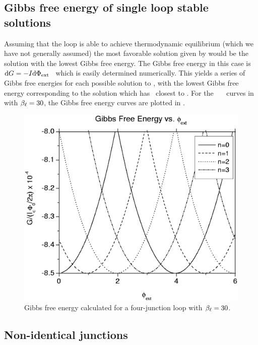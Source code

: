 \subsection{Gibbs free energy of single loop stable solutions}
\label{sec:gibbs_free_energy}

Assuming that the loop is able to achieve thermodynamic equilibrium
(which we have not generally assumed) the most favorable solution 
given by  would be the solution
with the lowest Gibbs free energy. The Gibbs free energy in this case
is $\mathrm{d} G = -I \mathrm{d}\Phi_{\mathrm{ext}}$\ \cite{silver_pr_157_317_1967,barone_and_paterno} 
which is easily determined 
numerically. 
This yields a series of Gibbs free energies for
each possible solution to , with
the lowest Gibbs free energy corresponding to the solution which
has \phitot\ closest to \phiext. 
For the \phitot\ \vs\ \phiext\ curves in 
 with $\beta_\ell = 30$, the
Gibbs free energy curves are plotted in
.

\begin{figure}[p]
\includegraphics[width=5.7in]{figs/jjarray/chap2fig4.eps}
\caption{Gibbs free energy calculated for a four-junction loop with
$\beta_\ell = 30$.} 
\label{fig:gibbs_free_energy}
\end{figure}

\subsection{Non-identical junctions}
\label{sec:unsymmetric_junctions}

